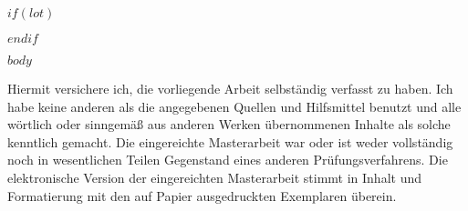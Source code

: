 \documentclass[a4paper,11pt]{article}
\begin{document}
	$if(lot)$
	\newpage
	\listoftables
	$endif$
	
	\newpage
	\pagestyle{plain}
	\setcounter{page}{1}    %
	
	$body$
	
	\newpage
	Hiermit versichere ich, die vorliegende Arbeit selbständig verfasst zu haben. Ich habe keine anderen als die angegebenen Quellen und Hilfsmittel benutzt und alle wörtlich oder sinngemäß aus   anderen   Werken   übernommenen   Inhalte   als   solche   kenntlich   gemacht.   Die   eingereichte Masterarbeit  war  oder  ist  weder  vollständig  noch  in  wesentlichen  Teilen  Gegenstand  eines  anderen Prüfungsverfahrens.  Die  elektronische  Version  der  eingereichten  Masterarbeit  stimmt  in  Inhalt  und Formatierung mit den auf Papier ausgedruckten Exemplaren überein.
	
	
\end{document}
